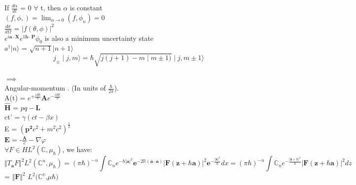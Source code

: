 \documentclass[a4paper, 10pt, onepage]{elegantbook}
\begin{document}
\begin{note}
 If $ \frac{d \alpha} {dt} $ = 0 $\forall$ t, then $\alpha$ is constant \\

 $(f,\phi,) = \lim_{\alpha \to 0} (f, \phi_n) = 0 $ \\

 $\frac{d \sigma} {d \Omega}$ = $|f(\theta, \phi)|^2$  \\

 $ e^{i \mathbf a \cdot \mathbf X} e^{1 \mathbf b \cdot \mathbf P} \phi_0$ is also a minimum uncertainty state  \\

 $a^\dagger |n \rangle$ = $\sqrt{n + 1} |n +1 \rangle$ \\

\begin{equation}
{\hat j_\pm} \mid j,m \rangle = \hbar \sqrt{j (j + 1) - m \mid m \pm 1)} \mid j, m \pm 1 \rangle
\end{equation} 

$\implies$ \\

Angular-momentum . \quad (In units of $\frac{\hbar}{2\pi}$).  \\
  
A(t) = $e^{+ \frac{iHt}{h}} \mathbf {A}e^{- \frac{iHt}{h}}$  \\
  
$\hat{\mathbf{H}}$ = $p \hat q - \mathbf L$ \\
 
ct' = $ \gamma(ct - \beta x)$ \\
 
E = $ ( \mathbf {p^2} c^2 + m^2 c^2)^ \frac{1}{2}$  \\

$ \mathbf E$ = -$ \frac{\mathbf {\dot A}}{c} - \nabla \varphi$   \\
 
$ \forall F \in H L^2(\mathbb C,\mu_\hbar)$, we have:  \\
\begin{equation}
\Vert T_\mathbf a F \Vert^2 L^2(\mathbb C^n,\mu_\hbar)
= (\pi \hbar)^{-n} \int \mathbb C_n  e^{- \hbar \vert \mathbf{a} \vert^2}  \mathbf{e}^{-2 \mathbb{R} (\bar{\mathbf{a}} \cdot {\mathbf{a}})} \vert \mathbf F (\mathbf z + \hbar \mathbf a ) \vert^2  \mathbf e^{- \frac{\vert \mathbf x \vert^2} {\hbar}}  dx
= (\pi \hbar)^{-n} \int \mathbb C_n e^{- \frac{\vert \mathbf z + \hbar \vert^2}{\hbar}} \vert \mathbf F(\mathbf z +\hbar \mathbf a) \vert^2 dz
\end{equation}
\noindent
= $\Vert \mathbf{F} \Vert^2$ $L^2(\mathbb{C^n}$,$\mu \hbar)$  \\
  

\end{note}
\end{document}
